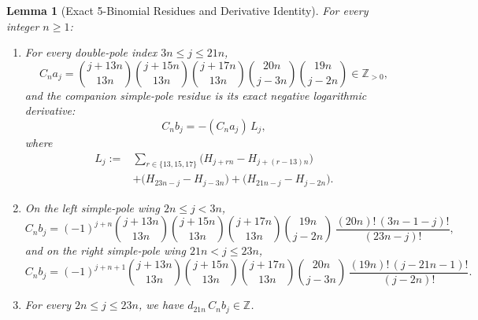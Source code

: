 \documentclass[11pt,reqno]{amsart}
\newtheorem{lemma}[theorem]{Lemma}
\theoremstyle{definition}
\theoremstyle{remark}
\newcommand{\ZZ}{\mathbb{Z}}
\begin{document}
\begin{lemma}[Exact 5-Binomial Residues and Derivative Identity]
\label{lem:binom-residues}
For every integer $n \ge 1$:
\begin{enumerate}
  \item[\emph{(a)}] For every double-pole index $3n \le j \le 21n$,
  \begin{equation}
  \label{eq:aj-binom}
    C_n a_j
    = \binom{j + 13n}{13n}\binom{j + 15n}{13n}\binom{j + 17n}{13n}
      \binom{20n}{j - 3n}\binom{19n}{j - 2n} \in \ZZ_{>0},
  \end{equation}
  and the companion simple-pole residue is its exact negative logarithmic derivative:
  \begin{equation}
  \label{eq:bj-deriv}
    C_n b_j = -(C_n a_j)\, L_j,
  \end{equation}
  where
  \begin{align*}
    L_j := &\sum_{r \in \{13, 15, 17\}} \bigl(H_{j+rn} - H_{j+(r-13)n}\bigr) \\
           &+ \bigl(H_{23n-j} - H_{j-3n}\bigr) + \bigl(H_{21n-j} - H_{j-2n}\bigr).
  \end{align*}
  \item[\emph{(b)}] On the left simple-pole wing $2n \le j < 3n$,
  \begin{equation}
  \label{eq:bj-left}
    C_n b_j = (-1)^{j+n}
      \binom{j + 13n}{13n}\binom{j + 15n}{13n}\binom{j + 17n}{13n}
      \binom{19n}{j - 2n}\,\frac{(20n)!\,(3n - 1 - j)!}{(23n - j)!},
  \end{equation}
  and on the right simple-pole wing $21n < j \le 23n$,
  \begin{equation}
  \label{eq:bj-right}
    C_n b_j = (-1)^{j+n+1}
      \binom{j + 13n}{13n}\binom{j + 15n}{13n}\binom{j + 17n}{13n}
      \binom{20n}{j - 3n}\,\frac{(19n)!\,(j - 21n - 1)!}{(j - 2n)!}.
  \end{equation}
  \item[\emph{(c)}] For every $2n \le j \le 23n$, we have $d_{21n}\, C_n b_j \in \ZZ$.
\end{enumerate}
\end{lemma}
\end{document}
